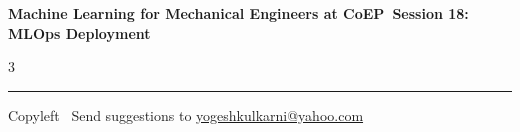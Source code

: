 \documentclass[8pt,landscape]{article}
\begin{document}
\footnotesize

\begin{center}
\Large{\textbf{Machine Learning for Mechanical Engineers at CoEP\ Session 18: MLOps Deployment}}
\end{center}

\begin{multicols}{3}

\end{multicols}

\rule{\linewidth}{0.25pt}
\scriptsize
Copyleft \textcopyleft\  Send suggestions to
\href{http://www.yogeshkulkarni.com}{yogeshkulkarni@yahoo.com}
\end{document}

